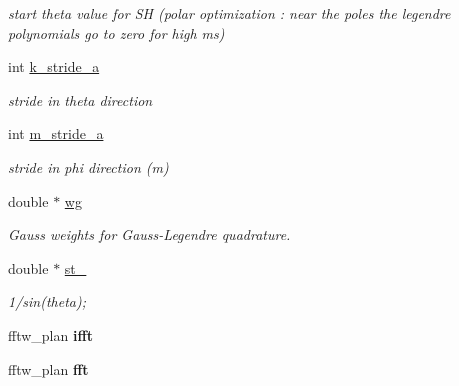 \begin{DoxyCompactItemize}
\begin{DoxyCompactList}\small\item\em start theta value for S\+H (polar optimization \+: near the poles the legendre polynomials go to zero for high m\textquotesingle{}s) \end{DoxyCompactList}\item 
\hypertarget{structshtns__info_a87e19b6bc65bf3d76cec4432d07bd3ff}{}int \hyperlink{structshtns__info_a87e19b6bc65bf3d76cec4432d07bd3ff}{k\+\_\+stride\+\_\+a}\label{structshtns__info_a87e19b6bc65bf3d76cec4432d07bd3ff}

\begin{DoxyCompactList}\small\item\em stride in theta direction \end{DoxyCompactList}\item 
\hypertarget{structshtns__info_ac77e4275a0d03ef91cf9c9329eca6911}{}int \hyperlink{structshtns__info_ac77e4275a0d03ef91cf9c9329eca6911}{m\+\_\+stride\+\_\+a}\label{structshtns__info_ac77e4275a0d03ef91cf9c9329eca6911}

\begin{DoxyCompactList}\small\item\em stride in phi direction (m) \end{DoxyCompactList}\item 
\hypertarget{structshtns__info_afa549ef135b12b5060b2afecc1f9e660}{}double $\ast$ \hyperlink{structshtns__info_afa549ef135b12b5060b2afecc1f9e660}{wg}\label{structshtns__info_afa549ef135b12b5060b2afecc1f9e660}

\begin{DoxyCompactList}\small\item\em Gauss weights for Gauss-\/\+Legendre quadrature. \end{DoxyCompactList}\item 
\hypertarget{structshtns__info_a646d0d38ed4bb1349d5cb5111b66e114}{}double $\ast$ \hyperlink{structshtns__info_a646d0d38ed4bb1349d5cb5111b66e114}{st\+\_}\label{structshtns__info_a646d0d38ed4bb1349d5cb5111b66e114}

\begin{DoxyCompactList}\small\item\em 1/sin(theta); \end{DoxyCompactList}\item 
\hypertarget{structshtns__info_a7f48e4f5949246c9dcd2849ed316a770}{}fftw\+\_\+plan {\bfseries ifft}\label{structshtns__info_a7f48e4f5949246c9dcd2849ed316a770}

\item 
\hypertarget{structshtns__info_a12542e7c997065065acc90d43fb754ba}{}fftw\+\_\+plan {\bfseries fft}\label{structshtns__info_a12542e7c997065065acc90d43fb754ba}


\end{DoxyCompactItemize}

